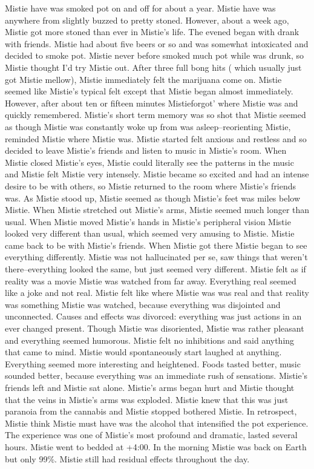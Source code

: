 \documentclass[12pt]{book}
\begin{document}
Mistie have was smoked pot on and off for about a year. Mistie have was anywhere from slightly buzzed to pretty stoned. However, about a week ago, Mistie got more stoned than ever in Mistie's life. The evened began with drank with friends. Mistie had about five beers or so and was somewhat intoxicated and decided to smoke pot. Mistie never before smoked much pot while was drunk, so Mistie thought I'd try Mistie out. After three full bong hits ( which usually just got Mistie mellow), Mistie immediately felt the marijuana come on. Mistie seemed like Mistie's typical felt except that Mistie began almost immediately. However, after about ten or fifteen minutes Mistieforgot' where Mistie was and quickly remembered. Mistie's short term memory was so shot that Mistie seemed as though Mistie was constantly woke up from was asleep--reorienting Mistie, reminded Mistie where Mistie was. Mistie started felt anxious and restless and so decided to leave Mistie's friends and listen to music in Mistie's room. When Mistie closed Mistie's eyes, Mistie could literally see the patterns in the music and Mistie felt Mistie very intensely. Mistie became so excited and had an intense desire to be with others, so Mistie returned to the room where Mistie's friends was. As Mistie stood up, Mistie seemed as though Mistie's feet was miles below Mistie. When Mistie stretched out Mistie's arms, Mistie seemed much longer than usual. When Mistie moved Mistie's hands in Mistie's peripheral vision Mistie looked very different than usual, which seemed very amusing to Mistie. Mistie came back to be with Mistie's friends. When Mistie got there Mistie began to see everything differently. Mistie was not hallucinated per se, saw things that weren't there--everything looked the same, but just seemed very different. Mistie felt as if reality was a movie Mistie was watched from far away. Everything real seemed like a joke and not real. Mistie felt like where Mistie was was real and that reality was something Mistie was watched, because everything was disjointed and unconnected. Causes and effects was divorced: everything was just actions in an ever changed present. Though Mistie was disoriented, Mistie was rather pleasant and everything seemed humorous. Mistie felt no inhibitions and said anything that came to mind. Mistie would spontaneously start laughed at anything. Everything seemed more interesting and heightened. Foods tasted better, music sounded better, because everything was an immediate rush of sensations. Mistie's friends left and Mistie sat alone. Mistie's arms began hurt and Mistie thought that the veins in Mistie's arms was exploded. Mistie knew that this was just paranoia from the cannabis and Mistie stopped bothered Mistie. In retrospect, Mistie think Mistie must have was the alcohol that intensified the pot experience. The experience was one of Mistie's most profound and dramatic, lasted several hours. Mistie went to bedded at +4:00. In the morning Mistie was back on Earth but only 99\%. Mistie still had residual effects throughout the day.
\end{document}
